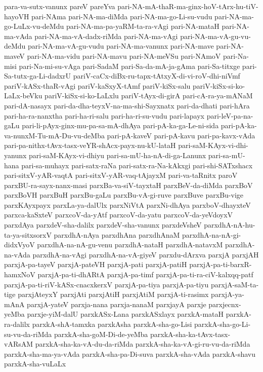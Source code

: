 {para-va-sutx-vanunx
pareV
pareYva
pari-NA-mA-thaR-ma-ginx-hoV-tArx-hu-tiV-hayoVH
pari-NAma
pari-NA-ma-diMda
pari-NA-ma-go-Li-su-vudu
pari-NA-ma-go-LuLx-vu-deMdu
pari-NA-ma-pa-yaRM-ta-ra-vAgi
pari-NA-mataH
pari-NA-ma-vAda
pari-NA-ma-vA-dadx-riMda
pari-NA-ma-vAgi
pari-NA-ma-vA-gu-vu-deMdu
pari-NA-ma-vA-gu-vudu
pari-NA-ma-vanunx
pari-NA-mave
pari-NA-maveV
pari-NA-ma-vidu
pari-NA-mavu
pari-NA-meVSu
pari-NAmoV
pari-Na-misi
pari-Na-mi-su-vAga
pari-SadaM
pari-Sa-da-mA-ja-gAma
pari-Sa-titxge
pari-Sa-tutx-ga-Li-dadxrU
pariV-caCx-diBx-ru-tapx-tAtxyX-di-vi-roV-dhi-niVmf
pariV-kASx-thaR-vAgi
pariV-kaSxyX-tAmf
pariV-kiSx-salu
pariV-kiSx-si-ko-LaLx-beVku
pariV-kiSx-si-ko-LaLxlu
pariV-tAyx-di-girA
pari-cA-ra-ya-mANaM
pari-dA-nasayx
pari-da-dha-teyxV-na-ma-shi-Sayxnatx
pari-da-dhati
pari-hAra
pari-ha-ra-nanxtha
pari-ha-ri-salu
pari-ha-ri-su-vudu
pari-lapayx
pari-leV-pa-na-gaLu
pari-li-pAyx-ginx-mu-pa-sa-mA-dhAya
pari-pA-ka-ga-Le-ni-sida
pari-pA-ka-va-nunxM-Tu-mA-Du-vu-deMba
pari-pA-kaveV
pari-pA-kavu
pari-pa-kavx-vAda
pari-pa-nithx-tAvx-tasx-veYR-shAcx-payx-nu-kU-lataH
pari-saM-KAyx-vi-dhi-yanunx
pari-saM-KAyx-vi-dhiyu
pari-sa-mU-ha-nA-di-ga-Lanunx
pari-sa-mU-hana
pari-sa-muhayx
pari-satx-raNa
pari-satx-ra-Na-kAkxgi
pari-shi-SATxshacx
pari-sitxV-yAR-vaqtA
pari-sitxV-yAR-vaq-tAjayxM
pari-va-taRnitx
paroV
parxBU-ra-sayx-nanx-masi
parxBa-va-siV-tayxtaH
parxBeV-da-diMda
parxBoV
parxBoVH
parxBuH
parxBu-gaLu
parxBu-vA-gi-ruve
parxBuve
parxBu-vige
parxKAyxpayx
parxLa-ya-dalUlx
parxNiVtA
parxNi-dhAya
parxboV-dhayxteV
parxca-kaSxteV
parxcoV-da-yAtf
parxcoV-da-yatu
parxcoV-da-yeVdoyxV
parxdAya
parxdeV-sha-dalilx
parxdeV-sha-vanunx
parxdeVsheV
parxdhA-nA-hu-ta-ya-sitxsorxV
parxdhA-nAya
parxdhAna
parxdhAnaM
parxdhA-na-nA-gi-didxVyoV
parxdhA-na-nA-gu-venu
parxdhA-nataH
parxdhA-natavxM
parxdhA-na-vAda
parxdhA-na-vAgi
parxdhA-na-vA-giyeV
parxdu-dArxva
parxjA
parxjAH
parxjA-pa-tayeV
parxjA-pateVH
parxjA-pati
parxjA-patiH
parxjA-pa-ti-barxR-hamxNoV
parxjA-pa-ti-dhARtA
parxjA-pa-timf
parxjA-pa-ti-ra-ciV-kalxqq-patf
parxjA-pa-ti-riV-kASx-cnacxkerxV
parxjA-pa-tiya
parxjA-pa-tiyu
parxjA-saM-ta-tige
parxjAteyxY
parxjAti
parxjAtiH
parxjAtiM
parxjA-ti-rasimx
parxjA-ya-mAnA
parxjA-yateV
parxja-nana
parxja-nanaM
parxjayA
parxje
parxjecnx-yeMba
parxje-yiM-dalU
parxkASx-Lana
parxkASxlayx
parxkA-mataH
parxkA-ra-dalilx
parxkA-shA-tamxka
parxkAsha
parxkA-sha-go-Lisi
parxkA-sha-go-Li-su-vu-da-riMda
parxkA-sha-goM-Di-de-yeMba
parxkA-sha-ka-tAvx-tasx-vARsAM
parxkA-sha-ka-vA-du-da-riMda
parxkA-sha-ka-vA-gi-ru-vu-da-riMda
parxkA-sha-ma-ya-vAda
parxkA-sha-pa-Di-suva
parxkA-sha-vAda
parxkA-shavu
parxkA-sha-vuLaLx
}
